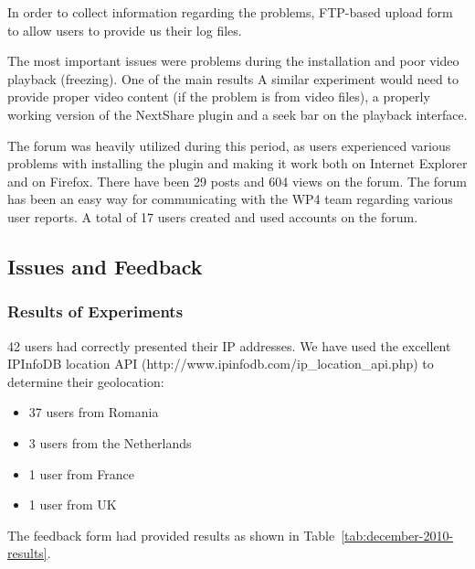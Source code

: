 In order to collect information regarding the problems, FTP-based upload form
to allow users to provide us their log files.

The most important issues were problems during the installation and poor video
playback (freezing). One of the main results A similar experiment would need
to provide proper video content (if the problem is from video files), a
properly working version of the NextShare plugin and a seek bar on the
playback interface.

The forum was heavily utilized during this period, as users experienced
various problems with installing the plugin and making it work both on
Internet Explorer and on Firefox. There have been 29 posts and 604 views on
the forum. The forum has been an easy way for communicating with the WP4 team
regarding various user reports. A total of 17 users created and used accounts
on the forum.

\subsection{Issues and Feedback}
\label{subsec:multimedia-dist:evaluation-issues}

\subsubsection{Results of Experiments}

42 users had correctly presented their IP addresses. We have used the
excellent IPInfoDB location API (http://www.ipinfodb.com/ip_location_api.php)
to determine their geolocation:
\begin{itemize}
  \item 37 users from Romania
  \item 3 users from the Netherlands
  \item 1 user from France
  \item 1 user from UK
\end{itemize}

The feedback form had provided results as shown in
Table~\ref{tab:december-2010-results}.

